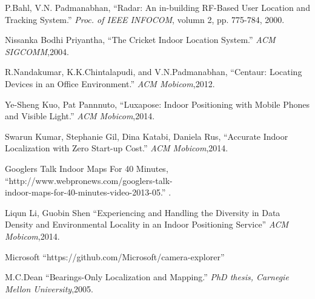 \documentclass[a4paper, 11pt]{article} %
\begin{document}

\begin{thebibliography}{10}
	
P.Bahl, V.N. Padmanabhan,
``Radar: An in-building RF-Based User Location and Tracking System.''
\textit{Proc. of IEEE INFOCOM}, volumn 2, pp. 775-784, 2000.

Nissanka Bodhi Priyantha,
``The Cricket Indoor Location System.''
\textit{ACM SIGCOMM},2004.

R.Nandakumar, K.K.Chintalapudi, and V.N.Padmanabhan,
``Centaur: Locating Devices in an Office Environment.''
\textit{ACM Mobicom},2012.

Ye-Sheng Kuo, Pat Pannnuto,
``Luxapose: Indoor Positioning with Mobile Phones and Visible Light.''
\textit{ACM Mobicom},2014.

Swarun Kumar, Stephanie Gil, Dina Katabi, Daniela Rus,
``Accurate Indoor Localization with Zero Start-up Cost.''
\textit{ACM Mobicom},2014.


Googlers Talk Indoor Maps For 40 Minutes,
``http://www.webpronews.com/googlers-talk-\\indoor-maps-for-40-minutes-video-2013-05.''
\textit{}.

Liqun Li, Guobin Shen
``Experiencing and Handling the Diversity in Data Density and Environmental Locality in an Indoor Positioning Service''
\textit{ACM Mobicom},2014.

Microsoft
``https://github.com/Microsoft/camera-explorer''
\textit{}

M.C.Dean
``Bearings-Only Localization and Mapping.''
\textit{PhD thesis, Carnegie Mellon University},2005.


\end{thebibliography}

\end{document}
